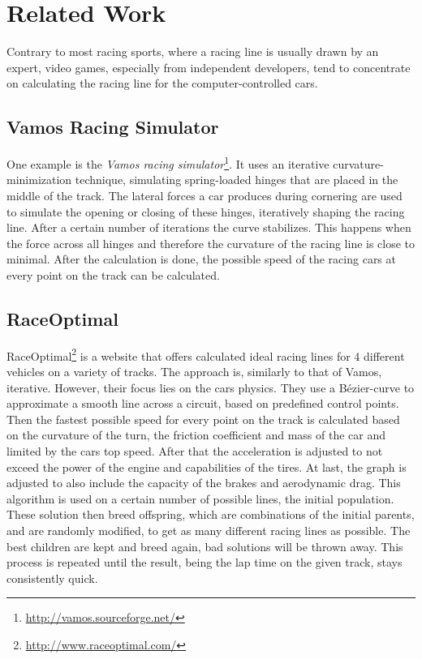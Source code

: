 \section{Related Work}
\label{sec:related_work}

Contrary to most racing sports, where a racing line is usually drawn by an expert, video games, especially from independent developers, tend to concentrate on calculating the racing line for the computer-controlled cars.

\subsection{Vamos Racing Simulator}
One example is the \textit{Vamos racing simulator}\footnote{\url{http://vamos.sourceforge.net/}}. It uses an iterative cur\-va\-ture-min\-i\-mi\-za\-tion technique, simulating spring-loaded hinges that are placed in the middle of the track. The lateral forces a car produces during cornering are used to simulate the opening or closing of these hinges, iteratively shaping the racing line. After a certain number of iterations the curve stabilizes. This happens when the force across all hinges and therefore the curvature of the racing line is close to minimal. After the calculation is done, the possible speed of the racing cars at every point on the track can be calculated. 

\subsection{RaceOptimal}
RaceOptimal\footnote{\url{http://www.raceoptimal.com/}} is a website that offers calculated ideal racing lines for 4 different vehicles on a variety of tracks. The approach is, similarly to that of Vamos, iterative. However, their focus lies on the cars physics. They use a Bézier-curve to approximate a smooth line across a circuit, based on predefined control points. Then the fastest possible speed for every point on the track is calculated based on the curvature of the turn, the friction coefficient and mass of the car and limited by the cars top speed.
\clearpage
After that the acceleration is adjusted to not exceed the power of the engine and capabilities of the tires. At last, the graph is adjusted to also include the capacity of the brakes and aerodynamic drag. 
This algorithm is used on a certain number of possible lines, the initial population. These solution then breed offspring, which are combinations of the initial parents, and are randomly modified, to get as many different racing lines as possible.
The best children are kept and breed again, bad solutions will be thrown away. This process is repeated until the result, being the lap time on the given track, stays consistently quick.

